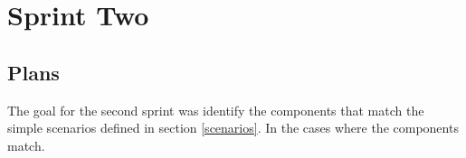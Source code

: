 \section{Sprint Two}

\subsection{Plans}
The goal for the second sprint was identify the components that match the simple scenarios defined in section \ref{scenarios}. In the cases where the components match.






